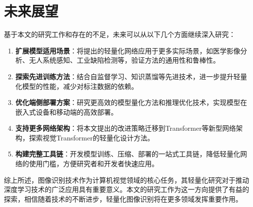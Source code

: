 \section{未来展望}

基于本文的研究工作和存在的不足，未来可以从以下几个方面继续深入研究：

\begin{enumerate}
    \item \textbf{扩展模型适用场景}：将提出的轻量化网络应用于更多实际场景，如医学影像分析、无人系统感知、工业缺陷检测等，验证方法的通用性和鲁棒性。

    \item \textbf{探索先进训练方法}：结合自监督学习、知识蒸馏等先进技术，进一步提升轻量化模型的性能，减少对标注数据的依赖。

    \item \textbf{优化端侧部署方案}：研究更高效的模型量化方法和推理优化技术，实现模型在嵌入式设备和移动端的高效部署。

    \item \textbf{支持更多网络架构}：将本文提出的改进策略迁移到Transformer等新型网络架构，探索视觉Transformer的轻量化设计方法。

    \item \textbf{构建完整工具链}：开发模型训练、压缩、部署的一站式工具链，降低轻量化网络的使用门槛，方便研究者和开发者快速应用。
\end{enumerate}

综上所述，图像识别技术作为计算机视觉领域的核心任务，其轻量化研究对于推动深度学习技术的广泛应用具有重要意义。本文的研究工作为这一方向提供了有益的探索，相信随着技术的不断进步，轻量化图像识别将在更多领域发挥重要作用。
